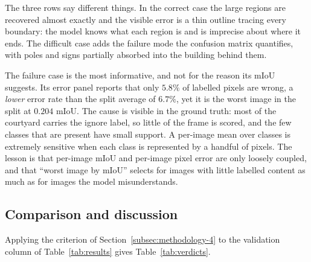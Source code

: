 The three rows say different things. In the correct case the large regions are recovered almost
exactly and the visible error is a thin outline tracing every boundary: the model knows what each
region is and is imprecise about where it ends. The difficult case adds the failure mode the
confusion matrix quantifies, with poles and signs partially absorbed into the building behind
them.

The failure case is the most informative, and not for the reason its mIoU suggests. Its error
panel reports that only $5.8\%$ of labelled pixels are wrong, a \emph{lower} error rate than the
split average of $6.7\%$, yet it is the worst image in the split at $0.204$ mIoU. The cause is
visible in the ground truth: most of the courtyard carries the ignore label, so little of the
frame is scored, and the few classes that are present have small support. A per-image mean
over classes is extremely sensitive when each class is represented by a handful of pixels. The
lesson is that per-image mIoU and per-image pixel error are only loosely coupled, and that
``worst image by mIoU'' selects for images with little labelled content as much as for images the
model misunderstands.

\subsection{Comparison and discussion}
\label{subsec:results-4}

Applying the criterion of Section~\ref{subsec:methodology-4} to the validation column of
Table~\ref{tab:results} gives Table~\ref{tab:verdicts}.


